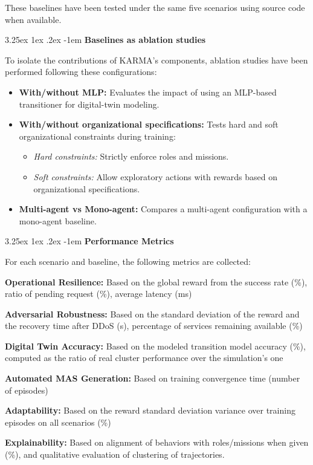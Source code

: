 \documentclass[conference]{IEEEtran}
\makeatletter
\renewcommand\paragraph{\@startsection{paragraph}{5}{\z@}%
  {3.25ex \@plus1ex \@minus.2ex}%
  {-1em}%
  {\normalfont\normalsize\bfseries}}
\makeatother
\begin{document}
These baselines have been tested under the same five scenarios using source code when available.

\paragraph{\textbf{Baselines as ablation studies}}

\noindent To isolate the contributions of KARMA's components, ablation studies have been performed following these configurations:
%
\begin{itemize}
    \item \textbf{With/without MLP:} Evaluates the impact of using an MLP-based transitioner for digital-twin modeling.
    \item \textbf{With/without organizational specifications:} Tests hard and soft organizational constraints during training:
        \begin{itemize}
            \item \textit{Hard constraints:} Strictly enforce roles and missions.
            \item \textit{Soft constraints:} Allow exploratory actions with rewards based on organizational specifications.
        \end{itemize}
    \item \textbf{Multi-agent vs Mono-agent:} Compares a multi-agent configuration with a mono-agent baseline.
\end{itemize}

\paragraph{\textbf{Performance Metrics}}

\noindent For each scenario and baseline, the following metrics are collected:
%
\begin{enumerate*}[label=\textbf{\arabic*)}, itemjoin={;\quad }]
    \item \textbf{Operational Resilience:} Based on the global reward from the success rate (\%), ratio of pending request (\%), average latency (ms)
    \item \textbf{Adversarial Robustness:} Based on the standard deviation of the reward and the recovery time after DDoS (s), percentage of services remaining available (\%)
    \item \textbf{Digital Twin Accuracy:} Based on the modeled transition model accuracy (\%), computed as the ratio of real cluster performance over the simulation's one
    \item \textbf{Automated MAS Generation:} Based on training convergence time (number of episodes)
    \item \textbf{Adaptability:} Based on the reward standard deviation variance over training episodes on all scenarios (\%)
    \item \textbf{Explainability:} Based on alignment of behaviors with roles/missions when given (\%), and qualitative evaluation of clustering of trajectories.
\end{enumerate*}
\end{document}

